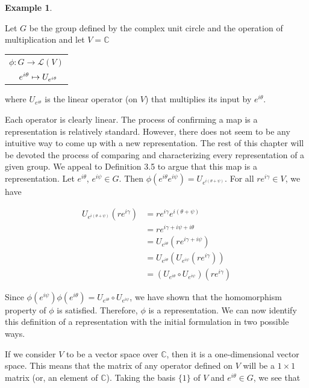\documentclass[10pt]{ucthesis}
\newtheorem{example}[definition]{Example}
\begin{document}
\begin{example}\end{example}
	Let $G$ be the group defined by the complex unit circle and the operation of multiplication and let $V = \mathbb{C}$ 
	\begin{center}
		 \begin{tabular}{l}$\phi:G\rightarrow \mathcal{L}(V)$\\
				$\hspace{4mm}e^{i\theta}\mapsto U_{e^{i\theta}}$
		\end{tabular}
	\end{center}
	where $U_{e^{i\theta}}$ is the linear operator (on $V$) that multiplies its input by $e^{i\theta}$. 


Each operator is clearly linear. The process of confirming a map is a representation is relatively standard. However, there does not seem to be any intuitive way to come up with a new representation. The rest of this chapter will be devoted the process of comparing and characterizing every representation of a given group. We appeal to Definition 3.5 to argue that this map is a representation. Let $e^{i\theta}$, $e^{i\psi} \in G$. Then $\phi(e^{i\theta} e^{i\psi}) = U_{e^{i(\theta+\psi)}}$. For all $re^{i\gamma} \in V$, we have

	\begin{equation}
		\begin{aligned}
			U_{e^{i(\theta+\psi)}}(re^{i\gamma}) &= re^{i\gamma}  e^{i(\theta+\psi)} \\
										&= re^{i\gamma + i\psi + i\theta} \\
										&= U_{e^{i\theta}}(re^{i\gamma + i\psi}) \\
										&= U_{e^{i\theta}}(U_{e^{i\psi}}(re^{i\gamma})) \\
										&= (U_{e^{i\theta}}\circ U_{e^{i\psi}}) (re^{i\gamma})
		\end{aligned}
	\end{equation}

Since $\phi(e^{i\psi})\phi(e^{i\theta}) = U_{e^{i\theta}}\circ U_{e^{i\psi}}$, we have shown that the homomorphism property of $\phi$ is satisfied. Therefore, $\phi$ is a representation. We can now identify this definition of a representation with the initial formulation in two possible ways.

If we consider $V$ to be a vector space over $\mathbb{C}$, then it is a one-dimensional vector space. This means that the matrix of any operator defined on $V$ will be a $1\times 1$ matrix (or, an element of $\mathbb{C}$). Taking the basis $\{1\}$ of $V$ and $e^{i\theta} \in G$, we see that 
\end{document}

